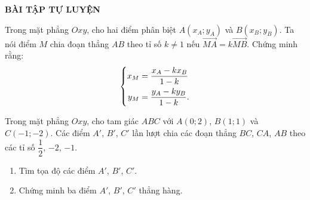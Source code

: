 \begin{center}
\textbf{BÀI TẬP TỰ LUYỆN}
\end{center}
\begin{bt}%
Trong mặt phẳng $Oxy$, cho hai điểm phân biệt $A(x_A;y_A)$ và $B(x_B;y_B)$. Ta nói điểm $M$ chia đoạn thẳng $AB$ theo tỉ số $k \neq 1$ nếu $\vec{MA}=k\vec{MB}$. Chứng minh rằng: $$\left\{\begin{aligned}x_M&=\dfrac{x_A-kx_B}{1-k}\\ y_M&=\dfrac{y_A-ky_B}{1-k}.\end{aligned}\right.$$
\end{bt}
\begin{bt}%
Trong mặt phẳng $Oxy$, cho tam giác $ABC$ với $A(0;2)$, $B(1;1)$ và $C(-1;-2)$. Các điểm $A'$, $B'$, $C'$ lần lượt chia các đoạn thẳng $BC$, $CA$, $AB$ theo các tỉ số $\dfrac{1}{2}$, $-2$, $-1$.
\begin{enumerate}[\bfseries a)]
\item Tìm tọa độ các điểm $A'$, $B'$, $C'$.
\item Chứng minh ba điểm $A'$, $B'$, $C'$ thẳng hàng.
\end{enumerate}
\end{bt}
